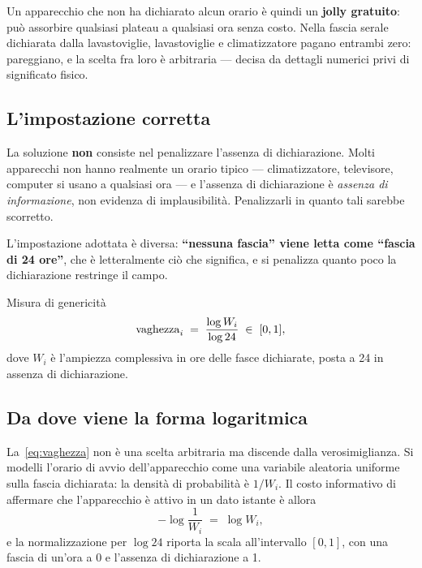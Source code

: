 Un apparecchio che non ha dichiarato alcun orario è quindi un \textbf{jolly gratuito}: può
assorbire qualsiasi plateau a qualsiasi ora senza costo. Nella fascia serale dichiarata dalla
lavastoviglie, lavastoviglie e climatizzatore pagano entrambi zero: pareggiano, e la scelta fra
loro è arbitraria --- decisa da dettagli numerici privi di significato fisico.

\subsection{L'impostazione corretta}

La soluzione \textbf{non} consiste nel penalizzare l'assenza di dichiarazione. Molti apparecchi
non hanno realmente un orario tipico --- climatizzatore, televisore, computer si usano a qualsiasi
ora --- e l'assenza di dichiarazione è \emph{assenza di informazione}, non evidenza di
implausibilità. Penalizzarli in quanto tali sarebbe scorretto.

L'impostazione adottata è diversa: \textbf{``nessuna fascia'' viene letta come ``fascia di 24
ore''}, che è letteralmente ciò che significa, e si penalizza quanto poco la dichiarazione
restringe il campo.

\begin{modelbox}{Misura di genericità}
\begin{equation}
  \operatorname{vaghezza}_i \;=\; \frac{\log W_i}{\log 24} \;\in\; [0,1],
  \label{eq:vaghezza}
\end{equation}
dove $W_i$ è l'ampiezza complessiva in ore delle fasce dichiarate, posta a 24 in assenza di
dichiarazione.
\end{modelbox}

\subsection{Da dove viene la forma logaritmica}

La~\eqref{eq:vaghezza} non è una scelta arbitraria ma discende dalla verosimiglianza. Si modelli
l'orario di avvio dell'apparecchio come una variabile aleatoria uniforme sulla fascia dichiarata:
la densità di probabilità è $1/W_i$. Il costo informativo di affermare che l'apparecchio è attivo
in un dato istante è allora
\begin{equation}
  -\log \frac{1}{W_i} \;=\; \log W_i ,
\end{equation}
e la normalizzazione per $\log 24$ riporta la scala all'intervallo $[0,1]$, con una fascia di
un'ora a 0 e l'assenza di dichiarazione a 1.

